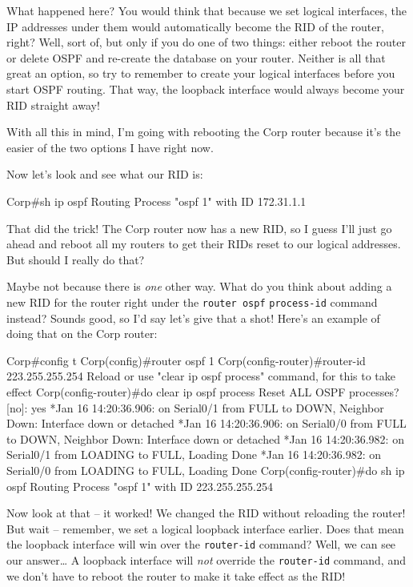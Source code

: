 What happened here? You would think that because we set logical
interfaces, the IP addresses under them would automatically become the
RID of the router, right? Well, sort of, but only if you do one of two
things: either reboot the router or delete OSPF and re-create the
database on your router. Neither is all that great an option, so try to
remember to create your logical interfaces before you start OSPF
routing. That way, the loopback interface would always become your RID
straight away!

With all this in mind, I'm going with rebooting the Corp router because
it's the easier of the two options I have right now.

Now let's look and see what our RID is:

\begin{cli}
Corp#sh ip ospf
 Routing Process "ospf 1" with ID 172.31.1.1
\end{cli}

That did the trick! The Corp router now has a new RID, so I guess I'll
just go ahead and reboot all my routers to get their RIDs reset to our
logical addresses. But should I really do that?

Maybe not because there is \emph{one} other way. What do you think about
adding a new RID for the router right under the \texttt{router\ ospf}
\texttt{process-id} command instead? Sounds good, so I'd say let's give
that a shot! Here's an example of doing that on the Corp router:

\begin{cli}
Corp#config t
Corp(config)#router ospf 1
Corp(config-router)#router-id 223.255.255.254
Reload or use "clear ip ospf process" command, for this to take effect
Corp(config-router)#do clear ip ospf process
Reset ALL OSPF processes? [no]: yes
*Jan 16 14:20:36.906: %
on Serial0/1 from FULL to DOWN, Neighbor Down: Interface down
or detached
*Jan 16 14:20:36.906: %
on Serial0/0 from FULL to DOWN, Neighbor Down: Interface down
or detached
*Jan 16 14:20:36.982: %
on Serial0/1 from LOADING to FULL, Loading Done
*Jan 16 14:20:36.982: %
on Serial0/0 from LOADING to FULL, Loading Done
Corp(config-router)#do sh ip ospf
 Routing Process "ospf 1" with ID 223.255.255.254
\end{cli}

\protect\hypertarget{c18.xhtmlux5cux23Page_765}{}{}Now look at that -- it
worked! We changed the RID without reloading the router! But
wait -- remember, we set a logical loopback interface earlier. Does that
mean the loopback interface will win over the \texttt{router-id}
command? Well, we can see our answer\ldots{} A loopback interface will
\emph{not} override the \texttt{router-id} command, and we don't have to
reboot the router to make it take effect as the RID!

